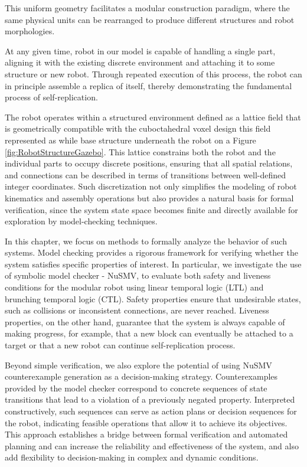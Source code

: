 This uniform geometry facilitates a modular construction paradigm, 
where the same physical units can be rearranged to produce different structures and
robot morphologies.

At any given time, robot in our model is capable of handling a single part, 
aligning it with the existing discrete environment and attaching it to some structure 
or new robot. 
Through repeated execution of this process, the robot can in principle assemble a 
replica of itself, thereby demonstrating the fundamental process of self-replication. 

The robot operates within a structured environment defined as a lattice 
field that is geometrically compatible with the cuboctahedral voxel design 
this field represented as while base structure underneath the robot 
on a Figure \ref{fig:RobotStructureGazebo}. 
This lattice  constrains both the robot and the individual 
parts to occupy discrete positions, ensuring that all spatial 
relations, and connections can be described in terms of 
transitions between well-defined integer coordinates. 
Such discretization not only simplifies the modeling of robot kinematics 
and assembly operations but also provides a natural basis for formal verification, 
since the system state space becomes finite and directly available for 
exploration by model-checking techniques.

In this chapter, we focus on methods to formally analyze the behavior of 
such systems. Model checking provides a rigorous framework for verifying 
whether the system satisfies specific properties of interest. In particular, 
we investigate the use of symbolic model checker - NuSMV, to evaluate 
both safety and liveness conditions for the modular robot using linear temporal logic (LTL)
and brunching temporal logic (CTL). 
Safety properties ensure that undesirable states, such as collisions or 
inconsistent connections, are never reached. 
Liveness properties, on the other hand, guarantee that the system is always capable of making 
progress, for example, that a new block can eventually be attached to 
a target or that a new robot can continue self-replication process.

Beyond simple verification, we also explore the potential of using NuSMV
counterexample generation as a decision-making strategy. Counterexamples provided 
by the model checker correspond to concrete sequences of state transitions that 
lead to a violation of a previously negated property. 
Interpreted constructively, such sequences 
can serve as action plans or decision sequences for the robot, 
indicating feasible operations that allow it to achieve its objectives. 
This approach establishes a bridge between formal verification and automated planning
and can increase the reliability and effectiveness of the system, and also
add flexibility to decision-making in complex and dynamic conditions. 

